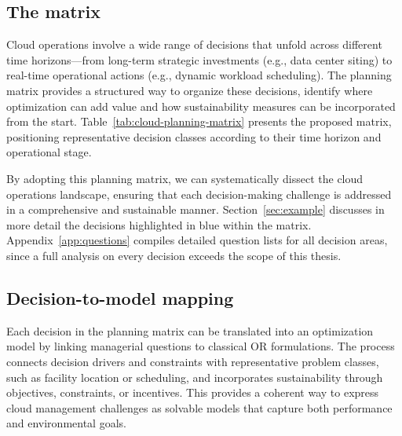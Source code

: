 \documentclass[pdflatex,sn-mathphys-num]{sn-jnl}
\theoremstyle{thmstyleone}
\theoremstyle{thmstyletwo}
\theoremstyle{thmstylethree}
\begin{document}
\subsection{The matrix}

Cloud operations involve a wide range of decisions that unfold across different time horizons—from long-term strategic investments (e.g., data center siting) to real-time operational actions (e.g., dynamic workload scheduling). 
The planning matrix provides a structured way to organize these decisions, identify where optimization can add value and how sustainability measures can be incorporated from the start. 
Table~\ref{tab:cloud-planning-matrix} presents the proposed matrix, positioning representative decision classes according to their time horizon and operational stage.



By adopting this planning matrix, we can systematically dissect the cloud operations landscape, ensuring that each decision-making challenge is addressed in a comprehensive and sustainable manner.
Section~\ref{sec:example} discusses in more detail the decisions highlighted in blue within the matrix. 
Appendix~\ref{app:questions} compiles detailed question lists for all decision areas, since a full analysis on every decision exceeds the scope of this thesis.

\subsection{Decision-to-model mapping}

Each decision in the planning matrix can be translated into an optimization model by linking managerial questions to classical OR formulations. The process connects decision drivers and constraints with representative problem classes, such as facility location or scheduling, and incorporates sustainability through objectives, constraints, or incentives. This provides a coherent way to express cloud management challenges as solvable models that capture both performance and environmental goals.
\end{document}
